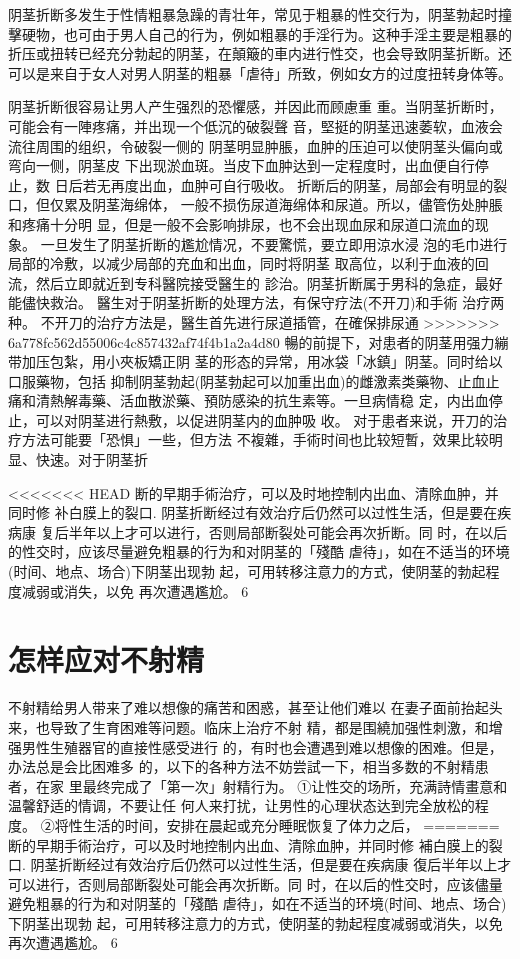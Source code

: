 \documentclass[12pt,UTF8]{ctexbook}
\begin{document}
阴茎折断多发生于性情粗暴急躁的青壮年，常见于粗暴的性交行为，阴茎勃起时撞擊硬物，也可由于男人自己的行为，例如粗暴的手淫行为。这种手淫主要是粗暴的折压或扭转已经充分勃起的阴茎，在顛簸的車内进行性交，也会导致阴茎折断。还可以是来自于女人对男人阴茎的粗暴「虐待」所致，例如女方的过度扭转身体等。

阴茎折断很容易让男人产生强烈的恐懼感，并因此而顾慮重
重。当阴茎折断时，可能会有一陣疼痛，并出现一个低沉的破裂聲
音，堅挺的阴茎迅速萎软，血液会流往周围的组织，令破裂一侧的
阴茎明显肿脹，血肿的压迫可以使阴茎头偏向或弯向一侧，阴茎皮
下出现淤血斑。当皮下血肿达到一定程度时，出血便自行停止，数
日后若无再度出血，血肿可自行吸收。
折断后的阴茎，局部会有明显的裂口，但仅累及阴茎海绵体，
一般不损伤尿道海绵体和尿道。所以，儘管伤处肿脹和疼痛十分明
显，但是一般不会影响排尿，也不会出现血尿和尿道口流血的现
象。
一旦发生了阴茎折断的尷尬情况，不要驚慌，要立即用涼水浸
泡的毛巾进行局部的冷敷，以减少局部的充血和出血，同时将阴茎
取高位，以利于血液的回流，然后立即就近到专科醫院接受醫生的
診治。阴茎折断属于男科的急症，最好能儘快救治。
醫生对于阴茎折断的处理方法，有保守疗法(不开刀)和手術
治疗两种。
不开刀的治疗方法是，醫生首先进行尿道插管，在確保排尿通
>>>>>>> 6a778fc562d55006c4c857432af74f4b1a2a4d80
暢的前提下，对患者的阴茎用强力繃带加压包紮，用小夾板矯正阴
茎的形态的异常，用冰袋「冰鎮」阴茎。同时给以口服藥物，包括
抑制阴茎勃起(阴茎勃起可以加重出血)的雌激素类藥物、止血止
痛和清熱解毒藥、活血散淤藥、預防感染的抗生素等。一旦病情稳
定，内出血停止，可以对阴茎进行熱敷，以促进阴茎内的血肿吸
收。
对于患者来说，开刀的治疗方法可能要「恐惧」一些，但方法
不複雜，手術时间也比较短暫，效果比较明显、快速。对于阴茎折

<<<<<<< HEAD
断的早期手術治疗，可以及时地控制内出血、清除血肿，并同时修
补白膜上的裂口.
阴茎折断经过有效治疗后仍然可以过性生活，但是要在疾病康
复后半年以上才可以进行，否则局部断裂处可能会再次折断。同
时，在以后的性交时，应该尽量避免粗暴的行为和对阴茎的「殘酷
虐待」，如在不适当的环境(时间、地点、场合)下阴茎出现勃
起，可用转移注意力的方式，使阴茎的勃起程度减弱或消失，以免
再次遭遇尷尬。
6
\section{怎样应对不射精}
不射精给男人带来了难以想像的痛苦和困惑，甚至让他们难以
在妻子面前抬起头来，也导致了生育困难等问题。临床上治疗不射
精，都是围繞加强性刺激，和增强男性生殖器官的直接性感受进行
的，有时也会遭遇到难以想像的困难。但是，办法总是会比困难多
的，以下的各种方法不妨尝試一下，相当多数的不射精患者，在家
里最终完成了「第一次」射精行为。
①让性交的场所，充满詩情畫意和温馨舒适的情调，不要让任
何人来打扰，让男性的心理状态达到完全放松的程度。
②将性生活的时间，安排在晨起或充分睡眠恢复了体力之后，
=======
断的早期手術治疗，可以及时地控制内出血、清除血肿，并同时修
補白膜上的裂口.
阴茎折断经过有效治疗后仍然可以过性生活，但是要在疾病康
復后半年以上才可以进行，否则局部断裂处可能会再次折断。同
时，在以后的性交时，应该儘量避免粗暴的行为和对阴茎的「殘酷
虐待」，如在不适当的环境(时间、地点、场合)下阴茎出现勃
起，可用转移注意力的方式，使阴茎的勃起程度减弱或消失，以免
再次遭遇尷尬。
6
\end{document}
